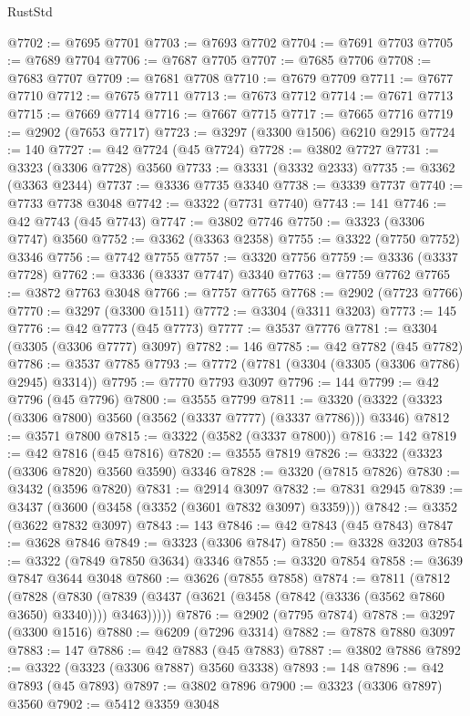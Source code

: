 \begin{lexlean}{RustStd}
\begin{coremodule}
@7702 := @7695 @7701
@7703 := @7693 @7702
@7704 := @7691 @7703
@7705 := @7689 @7704
@7706 := @7687 @7705
@7707 := @7685 @7706
@7708 := @7683 @7707
@7709 := @7681 @7708
@7710 := @7679 @7709
@7711 := @7677 @7710
@7712 := @7675 @7711
@7713 := @7673 @7712
@7714 := @7671 @7713
@7715 := @7669 @7714
@7716 := @7667 @7715
@7717 := @7665 @7716
@7719 := @2902 (@7653 @7717)
@7723 := @3297 (@3300 @1506) @6210 @2915
@7724 := 140
@7727 := @42 @7724 (@45 @7724)
@7728 := @3802 @7727
@7731 := @3323 (@3306 @7728) @3560
@7733 := @3331 (@3332 @2333)
@7735 := @3362 (@3363 @2344)
@7737 := @3336 @7735 @3340
@7738 := @3339 @7737
@7740 := @7733 @7738 @3048
@7742 := @3322 (@7731 @7740)
@7743 := 141
@7746 := @42 @7743 (@45 @7743)
@7747 := @3802 @7746
@7750 := @3323 (@3306 @7747) @3560
@7752 := @3362 (@3363 @2358)
@7755 := @3322 (@7750 @7752) @3346
@7756 := @7742 @7755
@7757 := @3320 @7756
@7759 := @3336 (@3337 @7728)
@7762 := @3336 (@3337 @7747) @3340
@7763 := @7759 @7762
@7765 := @3872 @7763 @3048
@7766 := @7757 @7765
@7768 := @2902 (@7723 @7766)
@7770 := @3297 (@3300 @1511)
@7772 := @3304 (@3311 @3203)
@7773 := 145
@7776 := @42 @7773 (@45 @7773)
@7777 := @3537 @7776
@7781 := @3304 (@3305 (@3306 @7777) @3097)
@7782 := 146
@7785 := @42 @7782 (@45 @7782)
@7786 := @3537 @7785
@7793 := @7772 (@7781 (@3304 (@3305 (@3306 @7786) @2945) @3314))
@7795 := @7770 @7793 @3097
@7796 := 144
@7799 := @42 @7796 (@45 @7796)
@7800 := @3555 @7799
@7811 := @3320 (@3322 (@3323 (@3306 @7800) @3560 (@3562 (@3337 @7777) (@3337 @7786))) @3346)
@7812 := @3571 @7800
@7815 := @3322 (@3582 (@3337 @7800))
@7816 := 142
@7819 := @42 @7816 (@45 @7816)
@7820 := @3555 @7819
@7826 := @3322 (@3323 (@3306 @7820) @3560 @3590) @3346
@7828 := @3320 (@7815 @7826)
@7830 := @3432 (@3596 @7820)
@7831 := @2914 @3097
@7832 := @7831 @2945
@7839 := @3437 (@3600 (@3458 (@3352 (@3601 @7832 @3097) @3359)))
@7842 := @3352 (@3622 @7832 @3097)
@7843 := 143
@7846 := @42 @7843 (@45 @7843)
@7847 := @3628 @7846
@7849 := @3323 (@3306 @7847)
@7850 := @3328 @3203
@7854 := @3322 (@7849 @7850 @3634) @3346
@7855 := @3320 @7854
@7858 := @3639 @7847 @3644 @3048
@7860 := @3626 (@7855 @7858)
@7874 := @7811
    (@7812
      (@7828
        (@7830 (@7839 (@3437 (@3621 (@3458 (@7842 (@3336 (@3562 @7860 @3650) @3340)))) @3463)))))
@7876 := @2902 (@7795 @7874)
@7878 := @3297 (@3300 @1516)
@7880 := @6209 (@7296 @3314)
@7882 := @7878 @7880 @3097
@7883 := 147
@7886 := @42 @7883 (@45 @7883)
@7887 := @3802 @7886
@7892 := @3322 (@3323 (@3306 @7887) @3560 @3338)
@7893 := 148
@7896 := @42 @7893 (@45 @7893)
@7897 := @3802 @7896
@7900 := @3323 (@3306 @7897) @3560
@7902 := @5412 @3359 @3048

\end{coremodule}
\end{lexlean}
